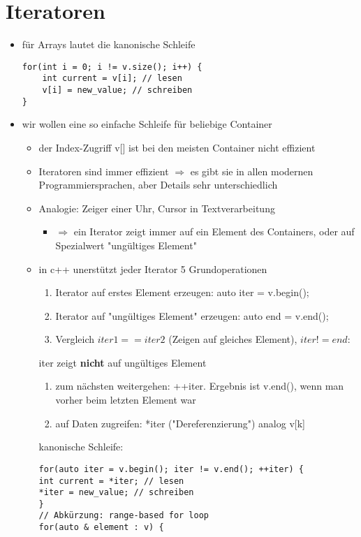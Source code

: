 \documentclass[a4paper]{scrartcl}
\begin{document}
\section{Iteratoren}
\label{sec-14}
\begin{itemize}
\item für Arrays lautet die kanonische Schleife
\begin{verbatim}
for(int i = 0; i != v.size(); i++) {
	int current = v[i]; // lesen
	v[i] = new_value; // schreiben
}
\end{verbatim}
\item wir wollen eine so einfache Schleife für beliebige Container
\begin{itemize}
\item der Index-Zugriff v[] ist bei den meisten Container nicht effizient
\item Iteratoren sind immer effizient $\Rightarrow$ es gibt sie in allen modernen Programmiersprachen, aber Details sehr unterschiedlich
\item Analogie: Zeiger einer Uhr, Cursor in Textverarbeitung
\begin{itemize}
\item $\Rightarrow$ ein Iterator zeigt immer auf ein Element des Containers, oder auf Spezialwert "ungültiges Element"
\end{itemize}
\item in c++ unerstützt jeder Iterator 5 Grundoperationen
\begin{enumerate}
\item Iterator auf erstes Element erzeugen: auto iter = v.begin();
\item Iterator auf "ungültiges Element" erzeugen: auto end = v.end();
\item Vergleich $iter1 == iter2$ (Zeigen auf gleiches Element), $iter != end$:
\end{enumerate}
iter zeigt \textbf{nicht} auf ungültiges Element
\begin{enumerate}
\item zum nächsten weitergehen: ++iter. Ergebnis ist v.end(), wenn man vorher beim letzten Element war
\item auf Daten zugreifen: *iter ("Dereferenzierung") analog v[k]
\end{enumerate}
kanonische Schleife:
\begin{verbatim}
for(auto iter = v.begin(); iter != v.end(); ++iter) {
int current = *iter; // lesen
*iter = new_value; // schreiben
}
// Abkürzung: range-based for loop
for(auto & element : v) {

\end{verbatim}
\end{itemize}
\end{itemize}
\end{document}

